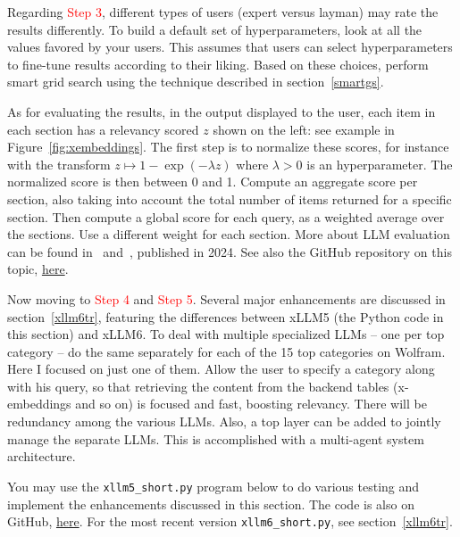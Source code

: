 \documentclass[oneside,10pt]{book}
\begin{document}
Regarding \textcolor{red}{Step 3}, different types of users (expert versus layman) may rate the results differently. To build a default set of hyperparameters, look at all
 the values favored by your users. This assumes that users can select hyperparameters to fine-tune results according to their liking. 
Based on these choices, perform \textcolor{index}{smart grid search} using the technique described in section~\ref{smartgs}.

As for evaluating the results, in the output displayed to the user, each item in each section has a relevancy scored $z$ shown on the left: see example in Figure~\ref{fig:xembeddings}.
The first step is to normalize these scores, for instance with the transform $z\mapsto 1-\exp(-\lambda z)$ where $\lambda>0 $ is an hyperparameter.  The normalized score
 is then between 0 and 1. Compute an aggregate score per section, also taking into account the total number of items returned for a specific section. Then compute a global score for each query, as a weighted average over the sections. Use a different weight for each section. More about
 LLM evaluation can be found in~\cite{24erw2} and~\cite{eval34edr}, published in 2024. See also the GitHub repository on this topic,
 \href{https://github.com/aishwaryanr/awesome-generative-ai-guide/blob/main/free_courses/Applied_LLMs_Mastery_2024/week6_llm_evaluation.md}{here}. 


Now moving to \textcolor{red}{Step 4} and \textcolor{red}{Step 5}. Several major enhancements are discussed in section~\ref{xllm6tr}, 
featuring the differences between xLLM5 (the Python code in this section) and xLLM6. To deal with multiple specialized LLMs -- one per top category -- do the same
 separately  for 
 each of the 15 top categories on Wolfram. Here I focused on just one of them. Allow the user to specify a category along with his query, so that
 retrieving the content from the backend tables (x-embeddings and so on) is focused and fast, boosting relevancy. There will be redundancy among the various LLMs. 
Also, a top layer can be added to jointly manage the separate LLMs. This is accomplished with a 
\textcolor{index}{multi-agent system} architecture.  


You may use the \texttt{xllm5\_short.py} program below to do various testing and implement the enhancements discussed in this section. 
The code is also on GitHub, \href{https://github.com/VincentGranville/Large-Language-Models/blob/main/xllm5/xllm5_short.py}{here}.  For
the most recent version \texttt{xllm6\_short.py}, see section~\ref{xllm6tr}. 
\vspace{1ex}
\end{document}
